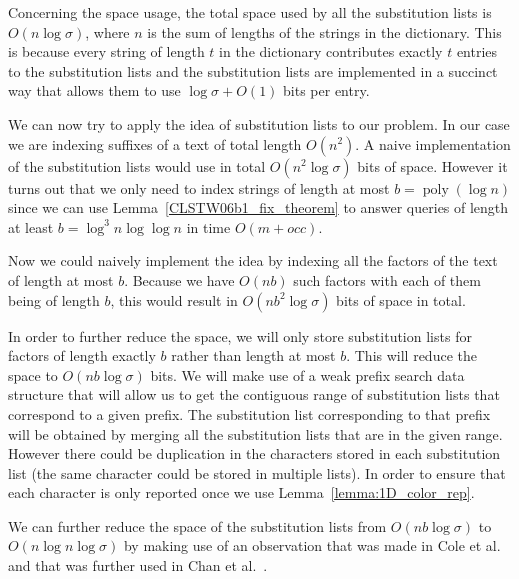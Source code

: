 \documentclass{article}
\newcommand{\?}{\mskip1.5mu}
\begin{document}
Concerning the space usage, the total space used by all the substitution lists is $O(n\log\sigma)$, where $n$ is the sum of lengths of the strings in the dictionary. This is because every string of length $t$ in the dictionary  contributes exactly $t$ entries to the substitution lists and the substitution lists are implemented in a succinct way that allows them to use $\log\sigma+O(1)$ bits per entry. 

We can now try to apply the idea of substitution lists to our problem. In our case we are indexing suffixes of a text of total length $O(n^2)$. A naive implementation of the substitution lists would use in total $O(n^2\log\sigma)$ bits of space. 
However it turns out that we only need to index strings of length at most $b=\operatorname{poly}(\log n)$ since we can use Lemma~\ref{CLSTW06b1_fix_theorem} to answer queries of length at least $b=\log^3 n\log\log n$ in time $O(m+occ)$. 


Now we could naively implement the idea by indexing all the factors of the text of length at most $b$. Because we have $O(nb)$ such factors with each of them being of length $b$, this would result in $O(nb^2\log\sigma)$ bits of space in total.

In order to further reduce the space, we will only store substitution lists for factors of length exactly $b$ rather than length at most $b$. This will reduce the space to $O(nb\log\sigma)$ bits. We will make use of a weak prefix search data structure that will allow us to get the contiguous range of substitution lists that correspond to a given prefix. The substitution list corresponding to that prefix will be obtained by merging all the substitution lists that are in the given range. 
However there could be duplication in the characters stored in each substitution list (the same character could be stored in multiple lists). In order to ensure that each character is only reported once we use Lemma~\ref{lemma:1D_color_rep}. 

We can further reduce the space of the substitution lists from $O(nb\log\sigma)$ to $O(n\log n\log\sigma)$ by making use of an observation that was made in Cole et al.~\cite{CGL04} and that was further used in Chan et al.~\cite{CLSTW10}. 
\end{document}

